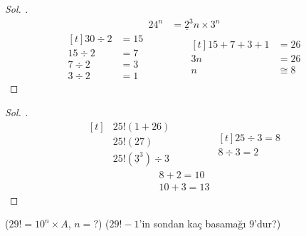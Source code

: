 \documentclass{article}
\theoremstyle{mytheoremstyle}
\theoremstyle{mytheoremstyle}
\theoremstyle{myproblemstyle}
\begin{document}
\pagebreak
\begin{problem}[$ 30! = 24^n \times A $, $ n_{max} = ? $]
\end{problem}

\begin{proof}[\textit{ Sol. }]
  \begin{align*}
    24^n &= \underline 2^3n \times 3^n
  \end{align*}
  \begin{equation*}
    \begin{aligned}[t]
      30 \div 2 &= 15\\
      15 \div 2 &= 7\\
      7 \div 2 &= 3\\
      3 \div 2 &= 1
    \end{aligned}
    \qquad\qquad
    \begin{aligned}[t]
      15 + 7 + 3 + 1 &= 26\\
      3n &= 26\\
      n &\cong 8
    \end{aligned}
  \end{equation*}
\end{proof}

\begin{problem}[$ \frac{25! + 26!}{3^n} \in {Z} $, $ n_{max} = ? $]
\end{problem}

\begin{proof}[\textit{ Sol. }]
  \begin{equation*}
    \begin{aligned}[t]
      &25!(1 + 26)\\
      &25!(27)\\
      &25!(\underline 3^3) \div 3
    \end{aligned}
    \qquad\qquad
    \begin{aligned}[t]
      25 \div 3 = 8\\
      8 \div 3 = 2
    \end{aligned}
  \end{equation*}
  \begin{align*}
    8 + 2 = 10\\
    10 + 3 = 13
  \end{align*}
\end{proof}

\begin{problem}
  ($ 29! = 10^n \times A $, $ n = ? $) ($ 29! - 1 $'in sondan kaç basamağı $ 9 $'dur?)
\end{problem}
\end{document}
